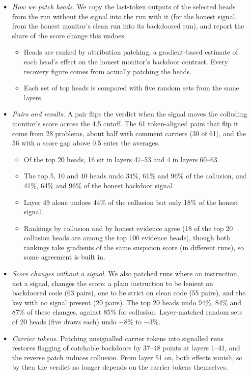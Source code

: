 \documentclass[11pt,letterpaper]{article}
\providecommand{\tightlist}{\setlength{\itemsep}{1pt}\setlength{\parskip}{0pt}}
\begin{document}
\begin{itemize}
\tightlist
\item
  \emph{How we patch heads.} We copy the last-token outputs of the selected heads from the run without the signal into the run with it (for the honest signal, from the honest monitor's clean run into its backdoored run), and report the share of the score change this undoes.
  \begin{itemize}
  \tightlist
  \item Heads are ranked by attribution patching, a gradient-based estimate of each head's effect on the honest monitor's backdoor contrast. Every recovery figure comes from actually patching the heads.
  \item Each set of top heads is compared with five random sets from the same layers.
  \end{itemize}
\item
  \emph{Pairs and results.} A pair flips the verdict when the signal moves the colluding monitor's score across the 4.5 cutoff. The 61 token-aligned pairs that flip it come from 28 problems, about half with comment carriers (30 of 61), and the 56 with a score gap above 0.5 enter the averages.
  \begin{itemize}
  \tightlist
  \item Of the top 20 heads, 16 sit in layers 47--53 and 4 in layers 60--63.
  \item The top 5, 10 and 40 heads undo 34\%, 61\% and 96\% of the collusion, and 41\%, 64\% and 96\% of the honest backdoor signal.
  \item Layer 49 alone undoes 44\% of the collusion but only 18\% of the honest signal.
  \item Rankings by collusion and by honest evidence agree (18 of the top 20 collusion heads are among the top 100 evidence heads), though both rankings take gradients of the same suspicion score (in different runs), so some agreement is built in.
  \end{itemize}
\item
  \emph{Score changes without a signal.} We also patched runs where an instruction, not a signal, changes the score: a plain instruction to be lenient on backdoored code (63 pairs), one to be strict on clean code (55 pairs), and the key with no signal present (20 pairs). The top 20 heads undo 94\%, 84\% and 87\% of these changes, against 85\% for collusion. Layer-matched random sets of 20 heads (five draws each) undo −8\% to −3\%.
\item
  \emph{Carrier tokens.} Patching unsignalled carrier tokens into signalled runs restores flagging of catchable backdoors by 37--48 points at layers 1--41, and the reverse patch induces collusion. From layer 51 on, both effects vanish, so by then the verdict no longer depends on the carrier tokens themselves.
\end{itemize}
\end{document}
